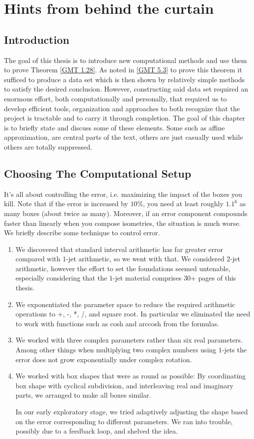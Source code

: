 \chapter{Hints from behind the curtain}\label{Ch.Crumbs}
\section{Introduction}
The goal of this thesis is
to introduce new computational methods
and use them to prove Theorem \ref{GMT 1.28}.
As noted in \ref{GMT 5.3} to prove this theorem it sufficed
to produce a data set which is then shown
by relatively simple methods to satisfy the desired conclusion.
However, constructing said data set required an enormous effort,
both computationally and personally,
that required us to develop efficient tools,
organization and approaches to both
recognize that the project is tractable
and to carry it through completion.
The goal of this chapter is to briefly state and discuss some of these elements.
Some such as affine approximation, are central parts of the text,
others are just casually used while others are totally suppressed.

\section{Choosing The Computational Setup}
It's all about controlling the error,
i.e.  maximizing the impact of the boxes you kill.
Note that if the error is increased by $10\%$,
you need at least roughly $1.1^6$ as many boxes (about twice as many).
Moreover, if an error component compounds faster than linearly
when you compose isometries, the situation is much worse.
We briefly describe some technique to control error.
\begin{enumerate}
	\item
		We discovered that standard interval arithmetic
		has far greater error compared with $1$-jet arithmetic,
		so we went with that.
		We considered 2-jet arithmetic,
		however the effort to set the foundations
		seemed untenable,
		especially considering that the $1$-jet material
		comprises 30+ pages of this thesis.
	\item
		We exponentiated the parameter space
		to reduce the required arithmetic operations
		to +, -, *, /, and square root.
		In particular we eliminated the need to work
		with functions such as cosh and arccosh from the formulas.
	\item
		We worked with three complex parameters
		rather than six real parameters.
		Among other things when multiplying
		two complex numbers using $1$-jets
		the error does not grow exponentially under complex rotation.
	\item
		We worked with box shapes that were as round as possible:
		By coordinating box shape with cyclical subdivision,
		and interleaving real and imaginary parts,
		we arranged to make all boxes similar.
		
		In our early exploratory stage,
		we tried adaptively adjusting the shape based on
		the error corresponding to different parameters.
		We ran into trouble, possibly due to a feedback loop,
		and shelved the idea.
\end{enumerate}

